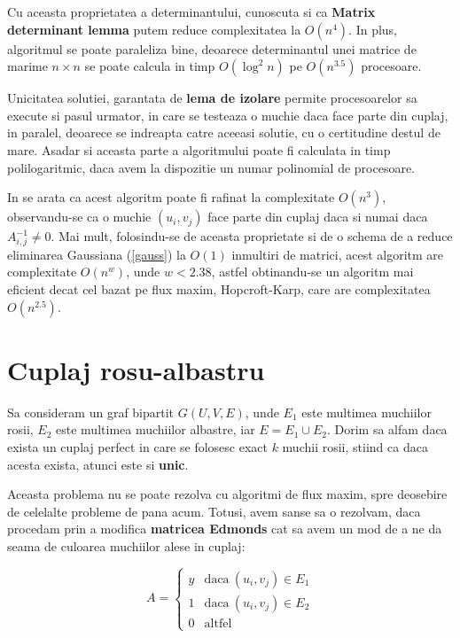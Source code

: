 Cu aceasta proprietatea a determinantului, cunoscuta si ca \textbf{Matrix
  determinant lemma} putem reduce complexitatea la $O(n^{4})$. In plus,
algoritmul se poate paraleliza bine, deoarece determinantul unei matrice
de marime $n \times n$ se poate calcula in timp $O(\log^{2}n)$ pe $O(n^{3.5})$ procesoare.

Unicitatea solutiei, garantata de \textbf{lema de izolare} permite procesoarelor
sa execute si pasul urmator, in care se testeaza o muchie daca face parte din
cuplaj, in paralel, deoarece se indreapta catre aceeasi solutie, cu o
certitudine destul de mare. Asadar si aceasta parte a algoritmului poate fi
calculata in timp polilogaritmic, daca avem la dispozitie un numar polinomial de
procesoare.

In \cite{optimalmatching} se arata ca acest algoritm poate fi rafinat la complexitate
$O(n^{3})$, observandu-se ca o muchie $(u_{i}, v_{j})$ face parte din cuplaj daca si
numai daca $A^{-1}_{i, j} \neq 0$. Mai mult, folosindu-se de aceasta proprietate si
de o schema de a reduce eliminarea Gaussiana (\ref{gauss}) la $O(1)$ inmultiri de matrici,
acest algoritm are complexitate $O(n^{w})$, unde $w < 2.38$, astfel obtinandu-se un
algoritm mai eficient decat cel bazat pe flux maxim, Hopcroft-Karp, care are complexitatea
$O(n^{2.5})$.

\pagebreak

\section{Cuplaj rosu-albastru}
\label{redbluematching}

Sa consideram un graf bipartit $G(U, V, E)$, unde $E_{1}$ este multimea
muchiilor rosii, $E_{2}$ este multimea muchiilor albastre, iar
$E = E_{1} \cup E_{2}$. Dorim sa alfam daca exista un cuplaj perfect
in care se folosesc exact $k$ muchii rosii, stiind ca daca acesta exista, atunci
este si \textbf{unic}. \par

Aceasta problema nu se poate rezolva cu algoritmi de flux maxim, spre deosebire
de celelalte probleme de pana acum. Totusi, avem sanse sa o rezolvam, daca
procedam prin a modifica \textbf{matricea Edmonds} cat sa avem un mod de a ne da seama de
culoarea muchiilor alese in cuplaj:

\begin{equation}
  A=
  \begin{cases}
    y & \text{daca}\ (u_{i}, v_{j}) \in E_{1} \\
    1 & \text{daca}\ (u_{i}, v_{j}) \in E_{2} \\
    0 & \text{altfel}
  \end{cases}
\end{equation}

